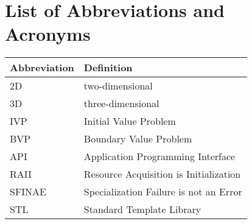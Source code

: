 \documentclass{stdlocal}
\begin{document}
  \section*{List of Abbreviations and Acronyms}

  \begin{table}[H]
    \center
    \renewcommand{\arraystretch}{1.3}
    \begin{tabularx}{\textwidth}{lX}
      \hline
      \textbf{Abbreviation} & \textbf{Definition} \\
      \hline
      \hline
      2D & two-dimensional \\
      3D & three-dimensional \\
      IVP & Initial Value Problem \\
      BVP & Boundary Value Problem \\
      \hline
      API & Application Programming Interface \\
      RAII & Resource Acquisition is Initialization \\
      SFINAE & Specialization Failure is not an Error \\
      STL & Standard Template Library \\
      \hline
    \end{tabularx}
  \end{table}
\end{document}
